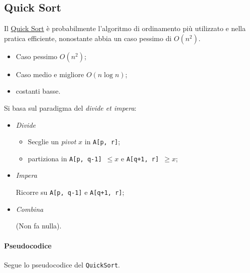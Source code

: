 \subsection{Quick Sort}
Il \href{https://en.wikipedia.org/wiki/Quicksort}{Quick Sort} è probabilmente l'algoritmo di ordinamento
più utilizzato e nella pratica efficiente, nonostante abbia un caso pessimo di $O(n^2)$.
\begin{itemize}
	\item Caso pessimo $O(n^2)$;
	\item Caso medio e migliore $O(n \log n)$;
	\item costanti basse.
\end{itemize}
Si basa sul paradigma del \textit{divide et impera}:
\begin{itemize}
	\item \textit{Divide}
	\begin{itemize}[label=$\rightarrow$]
		\item Secglie un \textit{pivot} $x$ in \texttt{A[p, r]};
		\item partiziona in \texttt{A[p, q-1] $\leq x$} e \texttt{A[q+1, r] $\geq x$};
	\end{itemize}
	\item \textit{Impera} \par
	Ricorre su \texttt{A[p, q-1]} e \texttt{A[q+1, r]};
	\item \textit{Combina}\par
	(Non fa nulla).
\end{itemize}

\paragraph{Pseudocodice} Segue lo pseudocodice del \texttt{QuickSort}.



